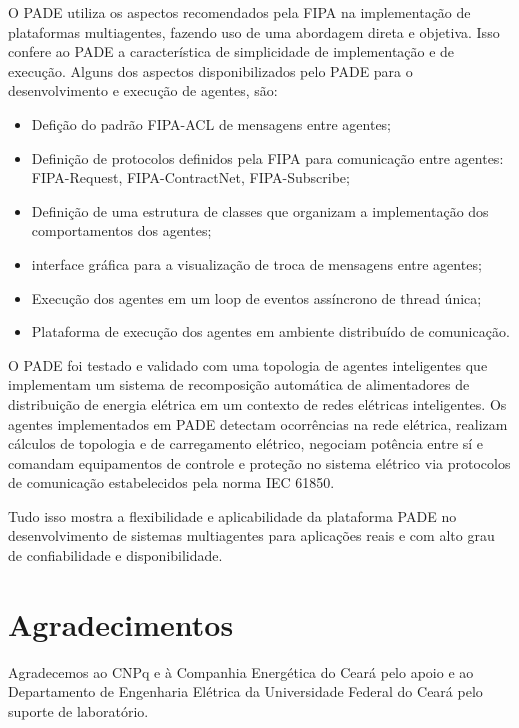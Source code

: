 \documentclass[journal]{IEEEtran}
\begin{document}
O PADE utiliza os aspectos recomendados pela FIPA na implementação de plataformas multiagentes, fazendo uso de uma abordagem direta e objetiva. Isso confere ao PADE a característica de simplicidade de implementação e de execução. Alguns dos aspectos disponibilizados pelo PADE para o desenvolvimento e execução de agentes, são:

\begin{itemize}
    \item Defição do padrão FIPA-ACL de mensagens entre agentes;
    \item Definição de protocolos definidos pela FIPA para comunicação entre agentes: FIPA-Request, FIPA-ContractNet, FIPA-Subscribe;
    \item Definição de uma estrutura de classes que organizam a implementação dos comportamentos dos agentes;
    \item interface gráfica para a visualização de troca de mensagens entre agentes;
    \item Execução dos agentes em um loop de eventos assíncrono de thread única;
    \item Plataforma de execução dos agentes em ambiente distribuído de comunicação.
\end{itemize}

O PADE foi testado e validado com uma topologia de agentes inteligentes que implementam um sistema de recomposição automática de alimentadores de distribuição de energia elétrica em um contexto de redes elétricas inteligentes. Os agentes implementados em PADE detectam ocorrências na rede elétrica, realizam cálculos de topologia e de carregamento elétrico, negociam potência entre sí e comandam equipamentos de controle e proteção no sistema elétrico via protocolos de comunicação estabelecidos pela norma IEC 61850.

Tudo isso mostra a flexibilidade e aplicabilidade da plataforma PADE no desenvolvimento de sistemas multiagentes para aplicações reais e com alto grau de confiabilidade e disponibilidade.


\section*{Agradecimentos}

Agradecemos ao CNPq e à Companhia Energética do Ceará pelo apoio e ao Departamento de Engenharia Elétrica da Universidade Federal do Ceará pelo suporte de laboratório.


\ifCLASSOPTIONcaptionsoff
  \newpage
\fi
\end{document}
